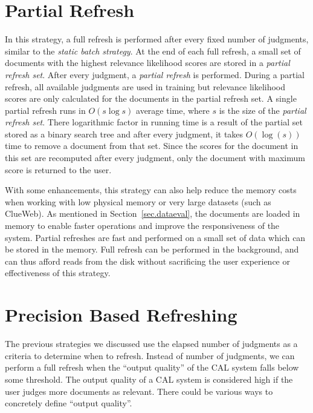 \section{Partial Refresh}

In this strategy, a full refresh is performed after every fixed number of
judgments, similar to the \textit{static batch strategy}. At the end of each
full refresh, a small set of documents with the highest relevance likelihood
scores are stored in a \textit{partial refresh set}. After every judgment, a
\textit{partial refresh} is performed. During a partial refresh, all available
judgments are used in training but relevance likelihood scores are only
calculated for the documents in the partial refresh set. A single partial
refresh runs in $O(s\log{s})$ average time, where $s$ is the size of the
\textit{partial refresh set}. There logarithmic factor in running time
is a result of the partial set stored as a binary search tree and after every
judgment, it takes $O(\log(s))$ time to remove a document from that set. Since
the scores for the document in this set are recomputed after every
judgment, only the document with maximum score is returned to the user.


With some enhancements, this strategy can also help reduce the memory costs
when working with low physical memory or very large datasets (such as ClueWeb).
As mentioned in Section~\ref{sec.dataeval}, the documents are loaded in memory
to enable faster operations and improve the responsiveness of the system.
Partial refreshes are fast and performed on a small set of data which can be
stored in the memory. Full refresh can be performed in the background, and can
thus afford reads from the disk without sacrificing the user experience or
effectiveness of this strategy.

\section{Precision Based Refreshing}

The previous strategies we discussed use the elapsed number of judgments as
a criteria to determine when to refresh. Instead of number of judgments, we can
perform a full refresh when the ``output quality'' of the CAL system falls below
some threshold. The output quality of a CAL system is considered high if the
user judges more documents as relevant. There could be various ways to
concretely define ``output quality''.

